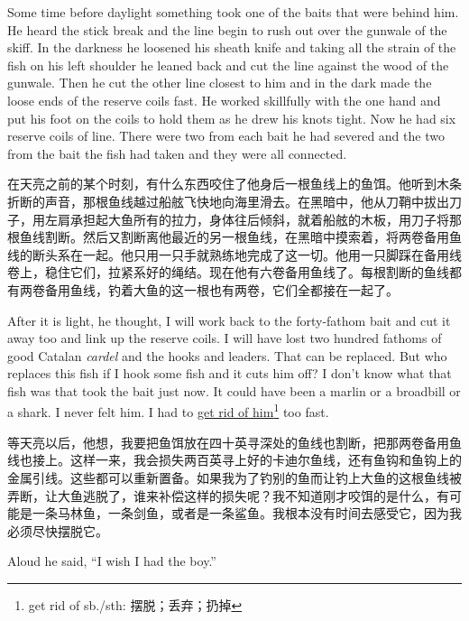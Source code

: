 \begin{paracol}{2}
Some time before daylight something took one of the baits that were behind
him. He heard the stick break and the line begin to rush out over the
\gls{gunwale} of the skiff. In the darkness he \gls{loosened} his
\gls{sheath} knife and taking all the strain of the fish on his left
shoulder he leaned back and cut the line against the wood of the gunwale.
Then he cut the other line closest to him and in the dark made the
\gls{loose} ends of the reserve coils fast. He worked \gls{skillfully} with
the one hand and put his foot on the coils to hold them as he \gls{drew} his
\glspl{knot} tight. Now he had six reserve coils of line. There were two
from each bait he had severed and the two from the bait the fish had taken
and they were all connected.

\switchcolumn

在天亮之前的某个时刻，有什么东西咬住了他身后一根鱼线上的鱼饵。他听到木条折断的声音，那根鱼线越过船舷飞快地向海里滑去。在黑暗中，他从刀鞘中拔出刀子，用左肩承担起大鱼所有的拉力，身体往后倾斜，就着船舷的木板，用刀子将那根鱼线割断。然后又割断离他最近的另一根鱼线，在黑暗中摸索着，将两卷备用鱼线的断头系在一起。他只用一只手就熟练地完成了这一切。他用一只脚踩在备用线卷上，稳住它们，拉紧系好的绳结。现在他有六卷备用鱼线了。每根割断的鱼线都有两卷备用鱼线，钓着大鱼的这一根也有两卷，它们全都接在一起了。

\switchcolumn*

After it is light, he thought, I will work back to the forty-fathom bait and
cut it away too and link up the reserve coils. I will have lost two hundred
fathoms of good Catalan \emph{cardel} and the hooks and leaders. That can be
replaced. But who replaces this fish if I hook some fish and it cuts him
off? I don't know what that fish was that took the bait just now. It could
have been a marlin or a broadbill or a shark. I never felt him. I had to \uline{get
rid of him}\footnote{get rid of sb./sth: 摆脱；丢弃；扔掉} too fast.

\switchcolumn

等天亮以后，他想，我要把鱼饵放在四十英寻深处的鱼线也割断，把那两卷备用鱼线也接上。这样一来，我会损失两百英寻上好的卡迪尔鱼线，还有鱼钩和鱼钩上的金属引线。这些都可以重新置备。如果我为了钓别的鱼而让钓上大鱼的这根鱼线被弄断，让大鱼逃脱了，谁来补偿这样的损失呢？我不知道刚才咬饵的是什么，有可能是一条马林鱼，一条剑鱼，或者是一条鲨鱼。我根本没有时间去感受它，因为我必须尽快摆脱它。

\switchcolumn*

Aloud he said, ``I wish I had the boy.''


\end{paracol}

